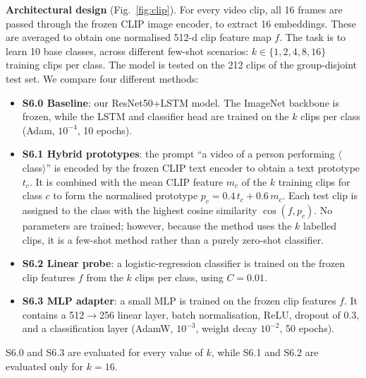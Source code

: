 \documentclass[conference]{IEEEtran}
\begin{document}
\textbf{Architectural design} (Fig.~\ref{fig:clip}). For every video clip, all 16 frames are passed through the frozen CLIP
image encoder, to extract 16 embeddings. These are averaged to obtain one normalised 512-d clip feature map $f$. The task is to learn 10 base classes, across different few-shot scenarios: $k\in\{1,2,4,8,16\}$ training clips per
class. The model is tested on the 212 clips of the group-disjoint test set.
We compare four different methods:
\begin{itemize}
\item \textbf{S6.0 Baseline}: our ResNet50+LSTM model. The ImageNet backbone is frozen,
while the LSTM and classifier head are trained on the $k$ clips per class (Adam,
$10^{-4}$, 10 epochs).
\item \textbf{S6.1 Hybrid prototypes}: the prompt ``a video of a person performing
$\langle$class$\rangle$'' is encoded by the frozen CLIP text encoder to obtain a text
prototype $t_c$. It is combined with the mean CLIP feature $m_c$ of the $k$ training clips
for class $c$ to form the normalised prototype
$p_c=0.4\,t_c+0.6\,m_c$. Each test clip is assigned to the class with the highest cosine
similarity $\cos(f,p_c)$. No parameters are trained; however, because the method uses the
$k$ labelled clips, it is a few-shot method rather than a purely zero-shot classifier.
\item \textbf{S6.2 Linear probe}: a logistic-regression classifier is trained on the
frozen clip features $f$ from the $k$ clips per class, using $C=0.01$.
\item \textbf{S6.3 MLP adapter}: a small MLP is trained on the frozen clip features $f$.
It contains a 512$\to$256 linear layer, batch normalisation, ReLU, dropout of 0.3, and a
classification layer (AdamW, $10^{-3}$, weight decay $10^{-2}$, 50 epochs).
\end{itemize}
S6.0 and S6.3 are evaluated for every value of $k$, while S6.1 and S6.2 are evaluated only
for $k=16$.
\end{document}

